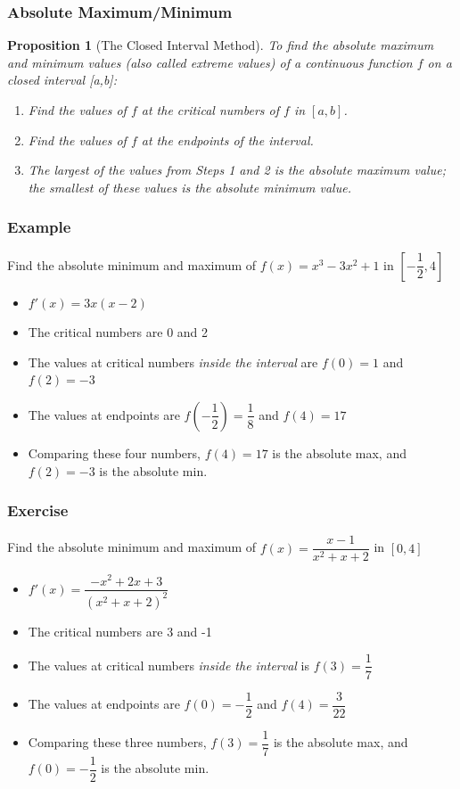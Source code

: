 \documentclass[t]{beamer}
\theoremstyle{plain}
\newtheorem{prop}{Proposition}
\theoremstyle{definition}
\begin{document}
\begin{frame}

\frametitle{Absolute Maximum/Minimum}

\begin{prop}[The Closed Interval Method]
To find the absolute maximum and minimum values (also called extreme values) of a continuous function $f$ on a closed interval [a,b]:
\begin{enumerate}
	\item Find the values of $f$ at the critical numbers of $f$ in $[a, b]$.
	\item Find the values of $f$ at the endpoints of the interval.
	\item The largest of the values from Steps 1 and 2 is the absolute maximum value; the smallest of these values is the absolute minimum value.
\end{enumerate}
\end{prop}

\end{frame}

\begin{frame}

\frametitle{Example}

Find the absolute minimum and maximum of $f(x) = x^3 - 3x^2 + 1$ in $[-\dfrac{1}{2}, 4]$\pause

\begin{itemize}
	\item $f'(x) = 3x(x-2)$
	\item The critical numbers are 0 and 2
	\item The values at critical numbers \textit{inside the interval} are $f(0) = 1$ and $f(2) = -3$
	\item The values at endpoints are $f(-\dfrac{1}{2})=\dfrac{1}{8}$ and $f(4) = 17$
	\item Comparing these four numbers, $f(4)=17$ is the absolute max, and $f(2)=-3$ is the absolute min.
\end{itemize}

\end{frame}

\begin{frame}

\frametitle{Exercise}

Find the absolute minimum and maximum of $f(x) = \dfrac{x-1}{x^2+x+2}$ in $[0, 4]$\pause

\begin{itemize}
	\item $f'(x) = \dfrac{-x^2+2x+3}{(x^2+x+2)^2}$
	\item The critical numbers are 3 and -1
	\item The values at critical numbers \textit{inside the interval} is $f(3) = \dfrac{1}{7}$
	\item The values at endpoints are $f(0)=-\dfrac{1}{2}$ and $f(4) = \dfrac{3}{22}$
	\item Comparing these three numbers, $f(3) = \dfrac{1}{7}$ is the absolute max, and $f(0)=-\dfrac{1}{2}$ is the absolute min.
\end{itemize}

\end{frame}
\end{document}
